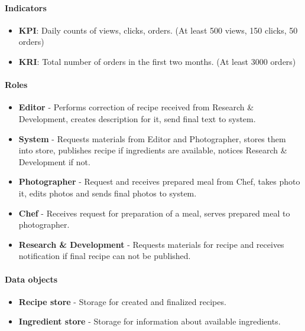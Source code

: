 \documentclass[11pt,a4paper]{article}
\begin{document}
\paragraph{Indicators}

\begin{itemize}
    \item \textbf{KPI}: Daily counts of views, clicks, orders. (At least 500 views, 150 clicks, 50 orders)
    \item \textbf{KRI}: Total number of orders in the first two months. (At least 3000 orders)
\end{itemize}

\paragraph{Roles}

\begin{itemize}
    \item \textbf{Editor} - Performs correction of recipe received from Research \& Development, creates description for it, send final text to system.
    \item \textbf{System} - Requests materials from Editor and Photographer, stores them into store, publishes recipe if ingredients are available, notices Research \& Development if not.
    \item \textbf{Photographer} - Request and receives prepared meal from Chef, takes photo it, edits photos and sends final photos to system.
    \item \textbf{Chef} - Receives request for preparation of a meal, serves prepared meal to photographer.
    \item \textbf{Research \& Development} - Requests materials for recipe and receives notification if final recipe can not be published.
\end{itemize}

\paragraph{Data objects}

\begin{itemize}
    \item \textbf{Recipe store} - Storage for created and finalized recipes.
    \item \textbf{Ingredient store} - Storage for information about available ingredients.
\end{itemize}

\newpage
\end{document}
